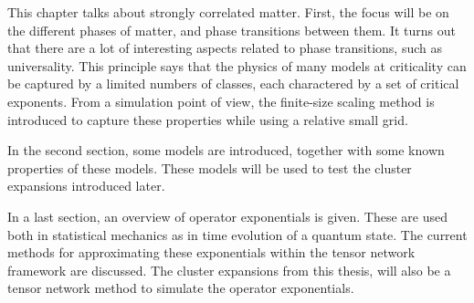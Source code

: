 This chapter talks about strongly correlated matter. First, the focus will be on the different phases of matter, and phase transitions between them. It turns out that there are a lot of interesting aspects related to phase transitions, such as universality. This principle says that the physics of many models at criticality can be captured by a limited numbers of classes, each charactered by a set of critical exponents. From a simulation point of view, the finite-size scaling method is introduced to capture these properties while using a relative small grid.

In the second section, some models are introduced, together with some known properties of these models. These models will be used to test the cluster expansions introduced later.

In a last section, an overview of operator exponentials is given. These are used both in statistical mechanics as in time evolution of a quantum state. The current methods for approximating these exponentials within the tensor network framework are discussed. The cluster expansions from this thesis, will also be a tensor network method to simulate the operator exponentials.